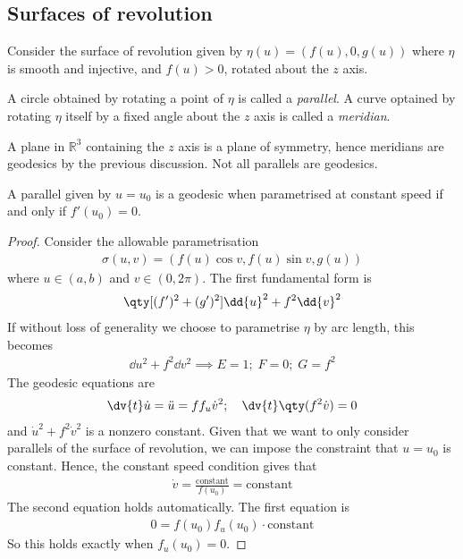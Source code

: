 \subsection{Surfaces of revolution}
Consider the surface of revolution given by $\eta(u) = (f(u), 0, g(u))$ where $\eta$ is smooth and injective, and $f(u) > 0$, rotated about the $z$ axis.
\begin{definition}
	A circle obtained by rotating a point of $\eta$ is called a \textit{parallel}.
	A curve optained by rotating $\eta$ itself by a fixed angle about the $z$ axis is called a \textit{meridian}.
\end{definition}
A plane in $\mathbb R^3$ containing the $z$ axis is a plane of symmetry, hence meridians are geodesics by the previous discussion.
Not all parallels are geodesics.
\begin{lemma}
	A parallel given by $u = u_0$ is a geodesic when parametrised at constant speed if and only if $f'(u_0) = 0$.
\end{lemma}
\begin{proof}
	Consider the allowable parametrisation
	\begin{align*}
		\sigma(u,v) = (f(u) \cos v, f(u) \sin v, g(u))
	\end{align*}
	where $u \in (a,b)$ and $v \in (0,2\pi)$.
	The first fundamental form is
	\begin{align*}
		\qty[ (f')^2 + (g')^2 ] \dd{u}^2 + f^2 \dd{v}^2
	\end{align*}
	If without loss of generality we choose to parametrise $\eta$ by arc length, this becomes
	\begin{align*}
		\dd{u}^2 + f^2 \dd{v}^2 \implies E = 1;\;F = 0;\;G = f^2
	\end{align*}
	The geodesic equations are
	\begin{align*}
		\dv{t} \dot u = \ddot u = f f_u \dot v^2;\quad \dv{t} \qty(f^2 \dot v) = 0
	\end{align*}
	and $\dot u^2 + f^2 \dot v^2$ is a nonzero constant.
	Given that we want to only consider parallels of the surface of revolution, we can impose the constraint that $u = u_0$ is constant.
	Hence, the constant speed condition gives that
	\begin{align*}
		\dot v = \frac{\text{constant}}{f(u_0)} = \text{constant}
	\end{align*}
	The second equation holds automatically.
	The first equation is
	\begin{align*}
		0 = f(u_0) f_u(u_0) \cdot \text{constant}
	\end{align*}
	So this holds exactly when $f_u(u_0) = 0$.
\end{proof}

